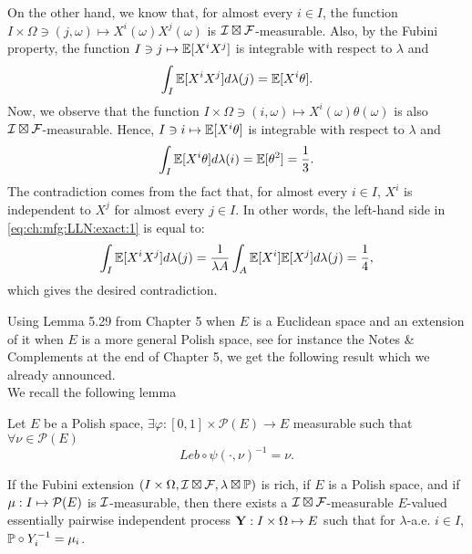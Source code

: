 {	On the other hand, we know that, for almost every $i \in I$, 
	the function $I \times \Omega \ni (j,\omega) \mapsto X^i(\omega) 
	X^j(\omega)$ is ${\cal I} \boxtimes {\cal F}$-measurable. Also, by 
	the Fubini property,
	the function $I \ni j \mapsto \mathbb{E}[X^i X^j]$ is integrable 
	with respect to $\lambda$ and 
	\begin{equation}
	\label{eq:ch:mfg:LLN:exact:1}
	\int_{I} \mathbb{E}[X^i X^j] d\lambda(j) = \mathbb{E}[X^i \theta]. 
	\end{equation} 
	Now, we observe that the function $I \times \Omega \ni (i,\omega) \mapsto 
	X^i(\omega) \theta(\omega)$ is also ${\cal I} \boxtimes {\cal F}$-measurable. 
	Hence, $I \ni i \mapsto \mathbb{E}[X^i \theta]$ is integrable with respect to 
	$\lambda$ and 
	\begin{equation*}
	\int_{I} \mathbb{E}[X^i \theta] d\lambda(i) = \mathbb{E}[\theta^2] = \frac13. 
	\end{equation*}
	The contradiction comes from the fact that, for almost every
	$i \in I$, $X^i$ is independent to $X^j$ for almost every $j \in I$. In other words,
	the left-hand side in 
	\eqref{eq:ch:mfg:LLN:exact:1}
	is equal to: 
	\begin{equation*}
	\int_{I} \mathbb{E}[X^i X^j] d\lambda(j) = \frac{1}{\lambda{A}} \int_A \mathbb{E}[X^i] \mathbb{E}[X^j] d\lambda(j) = \frac{1}{4},
	\end{equation*}
	which gives the desired contradiction. 
}

Using Lemma 5.29 from Chapter 5 
when $E$ is a Euclidean space and an extension of it when $E$ is a more general Polish space, see for instance the Notes \& Complements 
at the end of Chapter 5, 
we get the following result which we already announced.\\

We recall the following lemma
\begin{lemma}
	Let $E$ be a Polish space, $\exists \varphi: [0,1] \times \mathcal{P}(E) \to E$ measurable such that $\forall \nu \in \mathcal{P}(E)$ 
	$$
		Leb \circ \psi(\cdot, \nu)^{-1} = \nu.
	$$
\end{lemma}


\begin{proposition}
	\label{pr:rich_white_noise}
	If the Fubini extension $(I\times\Omega,{\cal I}\boxtimes{\cal F},\lambda\boxtimes\mathbb{P})$ is rich,
	if $E$ is a Polish space, and if $\mu:I\mapsto{\cal P}(E)$ is ${\cal I}$-measurable, then there exists a ${\cal I}\boxtimes{\cal F}$-measurable $E$-valued essentially pairwise independent process $\mathbf{Y}:I\times\Omega\mapsto E$ such that for $\lambda$-a.e. $i\in I$, $\mathbb{P}\circ Y_i^{-1}=\mu_i$.
\end{proposition}


